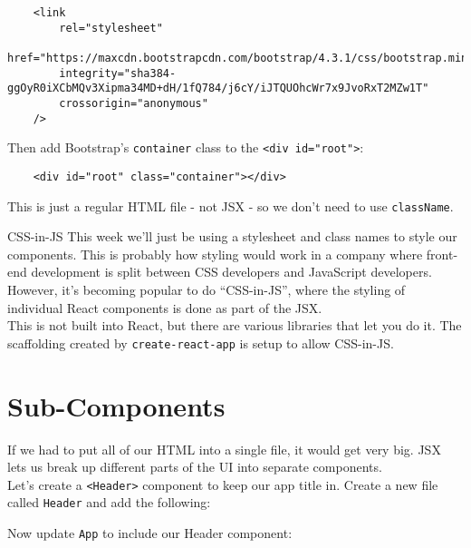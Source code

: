 \begin{verbatim}
    <link
        rel="stylesheet"
        href="https://maxcdn.bootstrapcdn.com/bootstrap/4.3.1/css/bootstrap.min.css"
        integrity="sha384-ggOyR0iXCbMQv3Xipma34MD+dH/1fQ784/j6cY/iJTQUOhcWr7x9JvoRxT2MZw1T"
        crossorigin="anonymous"
    />
\end{verbatim}

Then add Bootstrap's \texttt{container} class to the \texttt{<div id="root">}:

\begin{verbatim}
    <div id="root" class="container"></div>
\end{verbatim}

This is just a regular HTML file - not JSX - so we don't need to use \texttt{className}.


\begin{infobox}{CSS-in-JS}
    This week we'll just be using a stylesheet and class names to style our components. This is probably how styling would work in a company where front-end development is split between CSS developers and JavaScript developers.
    \\

    However, it's becoming popular to do ``CSS-in-JS'', where the styling of individual React components is done as part of the JSX.
    \\

    This is not built into React, but there are various libraries that let you do it. The scaffolding created by \texttt{create-react-app} is setup to allow CSS-in-JS.
\end{infobox}


\pagebreak


\section{Sub-Components}

If we had to put all of our HTML into a single file, it would get very big. JSX lets us break up different parts of the UI into separate components.
\\

Let's create a \texttt{<Header>} component to keep our app title in. Create a new file called \texttt{Header} and add the following:


Now update \texttt{App} to include our Header component:

